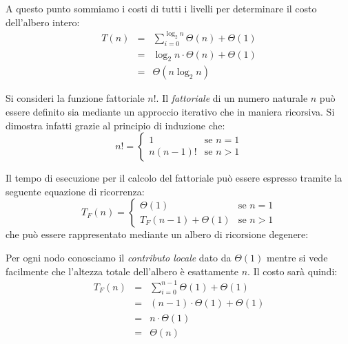 A questo punto sommiamo i costi di tutti i livelli per determinare il costo dell'albero intero:
\begin{eqnarray*}
	T(n) &=& \sum_{i=0}^{\log_{2}n}\Theta(n)+\Theta(1) \nonumber \\
	&=& \log_{2}n \cdot \Theta(n)+\Theta(1) \nonumber \\
	&=&\Theta(n\log_{2}n)
\end{eqnarray*}
\pagebreak
\begin{example}
	Si consideri la funzione fattoriale $n!$. Il \textit{fattoriale} di un numero naturale $n$ può essere definito sia mediante un approccio iterativo che in maniera ricorsiva. Si dimostra infatti grazie al principio di induzione che:
\begin{displaymath}
	n!=
	\begin{cases}
		1 & \mbox{se } n=1\\
		n(n-1)! & \mbox{se } n>1
	\end{cases}
\end{displaymath}
\end{example}

Il tempo di esecuzione per il calcolo del fattoriale può essere espresso tramite la seguente equazione di ricorrenza:
\begin{equation}\label{eq:fattoriale}
	T_{F}(n)=
	\begin{cases}
		\Theta(1) & \mbox{se } n =1 \\
		T_{F}(n-1)+\Theta(1) & \mbox{se } n>1
	\end{cases}
\end{equation}
che può essere rappresentato mediante un albero di ricorsione degenere:
\begin{center}
\end{center}

Per ogni nodo conosciamo il \textit{contributo locale} dato da $\Theta(1)$ mentre si vede facilmente che l'altezza totale dell'albero è esattamente $n$. Il costo sarà quindi:
\begin{eqnarray*}
	T_{F}(n) &=& \sum_{i=0}^{n-1} \Theta(1) + \Theta(1) \nonumber \\
	&=& (n-1)\cdot \Theta(1) + \Theta(1) \nonumber \\
	&=& n \cdot \Theta(1) \nonumber \\
	&=& \Theta(n)
\end{eqnarray*}

